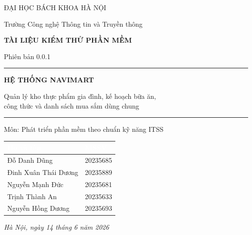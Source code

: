 \documentclass[12pt,a4paper]{article}
\newcommand{\thead}[1]{\textbf{\textcolor{white}{#1}}}
\begin{document}
\begin{titlepage}
\centering
\vspace*{1.2cm}
{\large ĐẠI HỌC BÁCH KHOA HÀ NỘI\par}
{\large Trường Công nghệ Thông tin và Truyền thông\par}
\vspace{2.4cm}
{\large\bfseries TÀI LIỆU KIỂM THỬ PHẦN MỀM\par}
{\normalsize Phiên bản 0.0.1\par}
\vspace{1.4cm}
\rule{0.8\linewidth}{0.4pt}\par
\vspace{0.6cm}
{\Huge\bfseries\color{navy} HỆ THỐNG NAVIMART\par}
\vspace{0.5cm}
{\large Quản lý kho thực phẩm gia đình, kế hoạch bữa ăn,\\[2pt] công thức và danh sách mua sắm dùng chung\par}
\vspace{0.4cm}
\rule{0.8\linewidth}{0.4pt}\par
\vspace{1.2cm}
{\large Môn: Phát triển phần mềm theo chuẩn kỹ năng ITSS\par}
\vspace{2cm}

\begin{tabular}{|l|l|}
\hline
\rowcolor{headerblue}
\thead{Họ và tên} & \thead{MSSV} \\
\hline
\rule{0pt}{2.4ex}Đỗ Danh Dũng & 20235685 \\
\hline
\rule{0pt}{2.4ex}Đinh Xuân Thái Dương & 20235889 \\
\hline
\rule{0pt}{2.4ex}Nguyễn Mạnh Đức & 20235681 \\
\hline
\rule{0pt}{2.4ex}Trịnh Thành An & 20235633 \\
\hline
\rule{0pt}{2.4ex}Nguyễn Hồng Dương & 20235693 \\
\hline
\end{tabular}

\vfill
{\itshape Hà Nội, ngày 14 tháng 6 năm 2026\par}
\end{titlepage}
\end{document}
